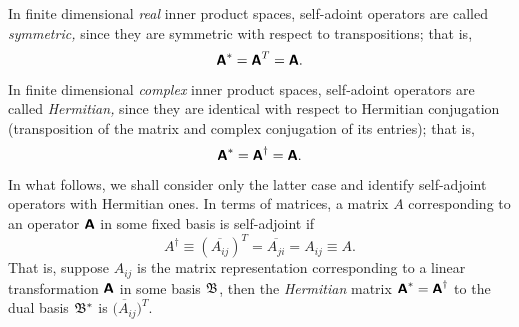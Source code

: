 In finite dimensional {\em real} inner product spaces,
self-adoint operators are called {\em symmetric,}
since they are symmetric with respect to transpositions; that is,
\begin{equation}
\textsf{\textbf{A}}^{\ast}= \textsf{\textbf{A}}^{T}=
\textsf{\textbf{A}}.
\end{equation}

In finite dimensional
{\em complex} inner product spaces,
self-adoint operators are called {\em Hermitian,}
since they are identical with respect to Hermitian conjugation (transposition of the matrix and complex conjugation of its
entries); that is,
\begin{equation}
\textsf{\textbf{A}}^{\ast}= \textsf{\textbf{A}}^{\dagger}=
\textsf{\textbf{A}}.
\end{equation}

In what follows, we shall consider only the latter case and identify self-adjoint operators with Hermitian ones.
In terms of matrices, a matrix $A$ corresponding to an operator $\textsf{\textbf{A}}$ in
some fixed basis is self-adjoint
if
\begin{equation}
A^{\dagger}\equiv (\overline{A_{ij}})^T=  \overline{A_{ji}} =A_{ij} \equiv A.
\end{equation}
That is, suppose $A_{ij}$ is the matrix representation
corresponding to a linear transformation $\textsf{\textbf{A}}$  in some basis ${\frak B}$,
then the {\em Hermitian} matrix $\textsf{\textbf{A}}^\ast = \textsf{\textbf{A}}^\dagger$
to the dual basis
${\frak B}^*$
is
$\overline{(A_{ij}})^T$.



